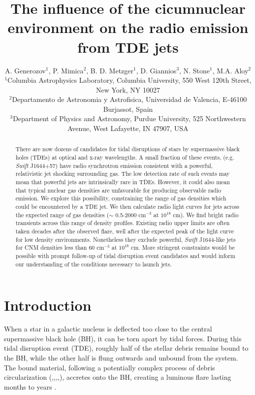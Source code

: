 \documentclass[usenatbib,fleqn]{mnras}
\title{The influence of the cicumnuclear environment on the radio emission from TDE jets}
\author[Generozov et al.]{ A. Generozov$^{1}$, P. Mimica$^{2}$,
  B. D. Metzger$^{1}$,
  D. Giannios$^{3}$, 
  N. Stone$^{1}$,
  M.A. Aloy$^{2}$ 
  \\
  $^{1}$Columbia Astrophysics Laboratory, Columbia University, 550 West 120th Street, New York, NY 10027\\
  $^{2}$Departamento de Astronomia y Astrofisica, Universidad de Valencia, E-46100 Burjassot, Spain\\
  $^{3}$Department of Physics and Astronomy, Purdue University, 525
  Northwestern Avenue, West Lafayette, IN 47907, USA}
\begin{document}
\maketitle
\begin{abstract}
  There are now dozens of candidates for tidal disruptions of stars by
  supermassive black holes (TDEs) at optical and x-ray wavelengths. A
  small fraction of these events, (e.g. {\it Swift} J1644+57) have radio
  synchrotron emission consistent with a powerful, relativistic jet
  shocking surrounding gas. The low detection rate of such events may
  mean that powerful jets are intrinsically rare in TDEs. However, it
  could also mean that typical nuclear gas densities are unfavorable
  for producing observable radio emission. We explore this
  possibility, constraining the range of gas densities which could be
  encountered by a TDE jet. We then calculate radio light curves for
  jets across the expected range of gas densities ($\sim$ 0.5-2000
  cm$^{-3}$ at $10^{18}$ cm). We find bright radio transients across
  this range of density profiles. Existing radio upper limits are
  often taken decades after the observed flare, well after the
  expected peak of the light curve for low density
  environments. Nonetheless they exclude powerful, {\it Swift} J1644-like
  jets for CNM densities less than 60 cm$^{-3}$ at $10^{18}$ cm. More
  stringent constraints would be possible with prompt follow-up of
  tidal disruption event candidates and would inform our understanding
  of the conditions necessary to launch jets.
\end{abstract}
\section{Introduction}
\label{sec:intro}
When a star in a galactic nucleus is deflected too close to the
central supermassive black hole (BH), it can be torn apart by tidal
forces.  During this tidal disruption event (TDE), roughly half of the
stellar debris remains bound to the BH, while the other half is flung
outwards and unbound from the system.  The bound material, following a
potentially complex process of debris circularization
(\citealt{Guillochon+2013},\citealt{Hayasaki+2013},\citealt{Hayasaki+2015},\citealt{Shiokawa+2015},\citealt{Bonnerot+2015}),
accretes onto the BH, creating a luminous flare lasting months to
years \citep{Hills1975, Carter+1982, Rees1988}.
\end{document}
